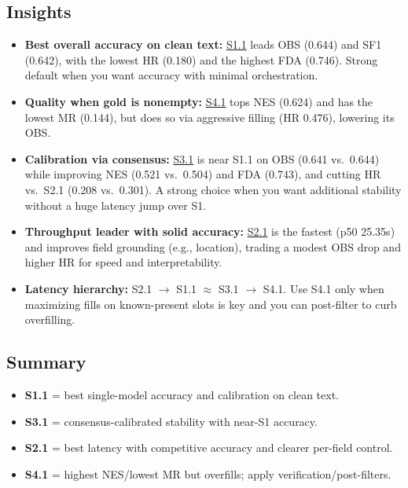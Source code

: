 \subsection*{Insights}

\begin{itemize}
    \item \textbf{Best overall accuracy on clean text:} \underline{S1.1} leads OBS (0.644) and SF1 (0.642), with the lowest HR (0.180) and the highest FDA (0.746). Strong default when you want accuracy with minimal orchestration.
    \item \textbf{Quality when gold is nonempty:} \underline{S4.1} tops NES (0.624) and has the lowest MR (0.144), but does so via aggressive filling (HR 0.476), lowering its OBS.
    \item \textbf{Calibration via consensus:} \underline{S3.1} is near S1.1 on OBS (0.641 vs.\ 0.644) while improving NES (0.521 vs.\ 0.504) and FDA (0.743), and cutting HR vs.\ S2.1 (0.208 vs.\ 0.301). A strong choice when you want additional stability without a huge latency jump over S1.
    \item \textbf{Throughput leader with solid accuracy:} \underline{S2.1} is the fastest (p50 25.35s) and improves field grounding (e.g., location), trading a modest OBS drop and higher HR for speed and interpretability.
    \item \textbf{Latency hierarchy:} S2.1 \(\rightarrow\) S1.1 \(\approx\) S3.1 \(\rightarrow\) S4.1. Use S4.1 only when maximizing fills on known-present slots is key and you can post-filter to curb overfilling.
\end{itemize}


\subsection*{Summary}

\begin{itemize}
    \item \textbf{S1.1} = best single-model accuracy and calibration on clean text.
    \item \textbf{S3.1} = consensus-calibrated stability with near-S1 accuracy.
    \item \textbf{S2.1} = best latency with competitive accuracy and clearer per-field control.
    \item \textbf{S4.1} = highest NES/lowest MR but overfills; apply verification/post-filters.
\end{itemize}
